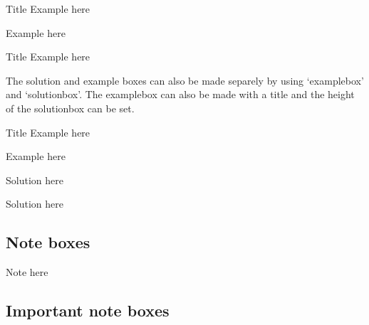 \documentclass[11pt,a4paper,twoside]{report}
\begin{document}
\begin{example}{Title}
  Example here
\end{example}

\begin{example}{}
  Example here
\end{example}


\begin{example}[height=2.5cm]{Title}
  Example here
\end{example}

The solution and example boxes can also be made separely by using `examplebox' and `solutionbox'. The examplebox can also be made with a title and the height of the solutionbox can be set.

\begin{examplebox}{Title}
  Example here
\end{examplebox}

\begin{examplebox}
  Example here
\end{examplebox}


\vspace{1em}
\begin{solutionbox}
  Solution here
\end{solutionbox}


\vspace{1em}
\begin{solutionbox}[height=2cm]
  Solution here
\end{solutionbox}

\subsection{Note boxes}

\begin{note}
  Note here
\end{note}

\subsection{Important note boxes}
\end{document}
